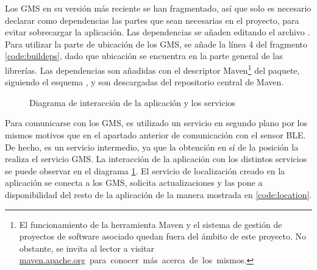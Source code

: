Los \ac{GMS} en su versión más reciente se han fragmentado, así que solo es necesario declarar como dependencias las partes que sean necesarias en el proyecto, para evitar sobrecargar la aplicación. Las dependencias se añaden editando el archivo . Para utilizar la parte de ubicación de los GMS, se añade la línea 4 del fragmento \ref{code:buildeps}, dado que ubicación se encuentra en la parte general de las librerías. Las dependencias son añadidas con el descriptor Maven\footnote{El funcionamiento de la herramienta Maven y el sistema de gestión de proyectos de software asociado quedan fuera del ámbito de este proyecto. No obstante, se invita al lector a visitar \mbox{\url{maven.apache.org} para conocer más acerca de los mismos.}} del paquete, siguiendo el esquema , y son descargadas del repositorio central de Maven.

\begin{figure}[h] \centering
{}
\caption{Diagrama de interacción de la aplicación y los servicios}\label{fig:diagrama:servicios}
\end{figure}

Para comunicarse con los \ac{GMS}, es utilizado un servicio en segundo plano por los mismos motivos que en el apartado anterior de comunicación con el sensor BLE. De hecho, es un servicio intermedio, ya que la obtención en sí de la posición la realiza el servicio \ac{GMS}. La interacción de la aplicación con los distintos servicios se puede observar en el diagrama \ref{fig:diagrama:servicios}. El servicio de localización creado en la aplicación se conecta a los \ac{GMS}, solicita actualizaciones y las pone a disponibilidad del resto de la aplicación de la manera mostrada en \ref{code:location}.

